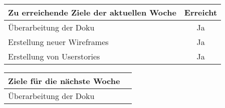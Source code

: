 \begin{tabularx}{\textwidth}{Xc}
    \arrayrulecolor{OliveGreen}
    \toprule
    {\bfseries Zu erreichende Ziele der aktuellen Woche} & {\bfseries Erreicht} \\
    \midrule[2pt]
    Überarbeitung der Doku                               &Ja                    \\
    \rowcolor{OliveGreen!15}
    Erstellung neuer Wireframes                          &Ja                    \\
    \rowcolor{White}
    Erstellung von Userstories                           &Ja                    \\
    \bottomrule[2pt]
\end{tabularx}
%
\vspace{1cm}
%
\begin{tabularx}{\textwidth}{Xc}
    \arrayrulecolor{OliveGreen}
    \toprule
    {\bfseries Ziele für die nächste Woche}              &                      \\
    \midrule[2pt]
    Überarbeitung der Doku                               &                      \\
\end{tabularx}
